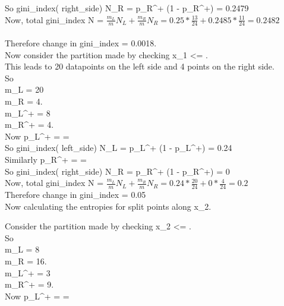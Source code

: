 \documentclass[twoside,10pt,a4paper]{article}
\theoremstyle{definition}
\theoremstyle{definition}
\theoremstyle{remark}
\renewcommand{\>}{{\rightarrow}}
\newcommand{\1}{{\mathbf 1}}
\newcommand{\0}{{\mathbf 0}}
\begin{document}
So
gini\_index( right\_side) N_R = p_R^+ (1 - p_R^+) = 0.2479\\

Now, total gini\_index N = $\frac{ m_L }{ m } N_L + \frac{m_R}{m} N_R = 0.25 * \frac{13}{24} + 0.2485 * \frac{11}{24} = 0.2482$\\ ~\\

Therefore change in gini\_index = 0.0018.\\

Now consider the partition made by checking x_1 <= .\\

This leads to 20 datapoints on the left side and 4 points on the right side.\\

So \\
m_L = 20 \\
m_R = 4.\\
m_L^+ = 8 \\
m_R^+ = 4.\\

Now
p_L^+ =  =  \\

So
gini\_index( left\_side) N_L = p_L^+ (1 - p_L^+) = 0.24\\

Similarly
p_R^+ =  =  \\

So
gini\_index( right\_side) N_R = p_R^+ (1 - p_R^+) = 0\\

Now, total gini\_index N = $\frac{ m_L }{ m } N_L + \frac{m_R}{m} N_R = 0.24 * \frac{20}{24} + 0 * \frac{4}{24} = 0.2$\\

Therefore change in gini\_index = 0.05\\

Now calculating the entropies for split points along x_2.

Consider the partition made by checking x_2 <= .\\

So \\
m_L = 8 \\
m_R = 16.\\
m_L^+ = 3 \\
m_R^+ = 9.\\

Now
p_L^+ =  =  \\
\end{document}
